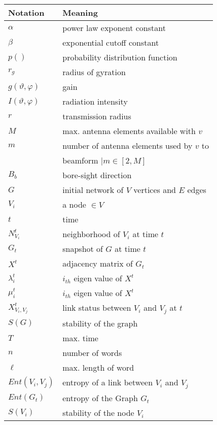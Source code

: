 \documentclass[preprint, twocolumn,5p]{elsarticle}
\begin{document}
\begin{table}[!htb]
\centering
    \begin{tabular}{|l|l|}
        \hline
        \textbf{Notation} & \textbf{Meaning}\\
        \hline
        $\alpha$ & power law exponent constant\\
        $\beta$ & exponential cutoff constant\\
        $p()$ & probability distribution function\\
        $r_{g}$ & radius of gyration\\
        $g(\vartheta,\varphi)$ & gain\\
        $I(\vartheta,\varphi)$ & radiation intensity\\
        $r$ & transmission radius\\
        $M$ & max. antenna elements available with $v$\\
        $m$ & number of antenna elements used by $v$ to \\
            & beamform $| m\in [2,M]$\\
        $B_{b}$ & bore-sight direction\\
        $G$ & initial network of $V$ vertices and $E$ edges\\
        $V_{i}$ & a node $\in V$\\
        $t$ & time\\
        $N_{V_{i}}^{t}$ & neighborhood of $V_{i}$ at time $t$\\
        $G_{t}$ & snapshot of $G$ at time $t$\\
        $X^{t}$ & adjacency matrix of $G_{t}$\\
        $\lambda_{i}^{t}$& $i_{th}$ eigen value of $X^{t}$\\
        $\mu_{i}^{t}$& $i_{th}$ eigen value of $X^{t}$\\
        $X^{t}_{V_{i},V_{j}}$ & link status between $V_{i}$ and $V_{j}$ at $t$\\
        $S(G)$ & stability of the graph\\
        $T$ & max. time\\
        $n$ & number of words\\
        $\ell$ & max. length of word\\
        $Ent(V_{i},V_{j})$ & entropy of a link between $V_{i}$ and $V_{j}$\\
        $Ent(G_{t})$ & entropy of the Graph $G_{t}$\\
        $S(V_{i})$ & stability of the node $V_{i}$\\

\end{tabular}
\end{table}
\end{document}
